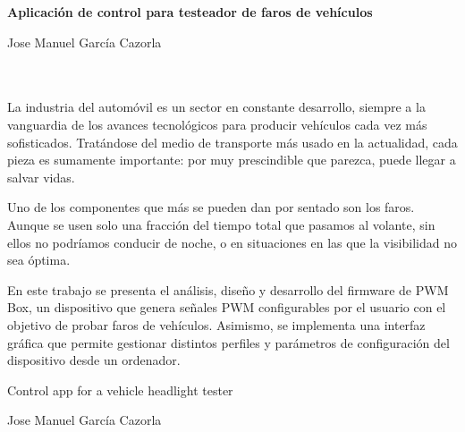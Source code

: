 \begin{center}
    \large\bfseries Aplicación de control para testeador de faros de vehículos
\end{center}

\begin{center}
    Jose Manuel García Cazorla\\
\end{center}

\\

\vspace{0.7cm}
\\

La industria del automóvil es un sector en constante desarrollo, siempre a la vanguardia de los avances tecnológicos para producir vehículos cada vez más sofisticados. Tratándose del medio de transporte más usado en la actualidad, cada pieza es sumamente importante: por muy prescindible que parezca, puede llegar a salvar vidas.

Uno de los componentes que más se pueden dan por sentado son los faros. Aunque se usen solo una fracción del tiempo total que pasamos al volante, sin ellos no podríamos conducir de noche, o en situaciones en las que la visibilidad no sea óptima.

En este trabajo se presenta el análisis, diseño y desarrollo del firmware de PWM Box, un dispositivo que genera señales PWM configurables por el usuario con el objetivo de probar faros de vehículos. Asimismo, se implementa una interfaz gráfica que permite gestionar distintos perfiles y parámetros de configuración del dispositivo desde un ordenador.

\cleardoublepage

\thispagestyle{empty}

\begin{center}
    Control app for a vehicle headlight tester
\end{center}

\begin{center}
    Jose Manuel García Cazorla\\
\end{center}

\\

\vspace{0.7cm}
\\

